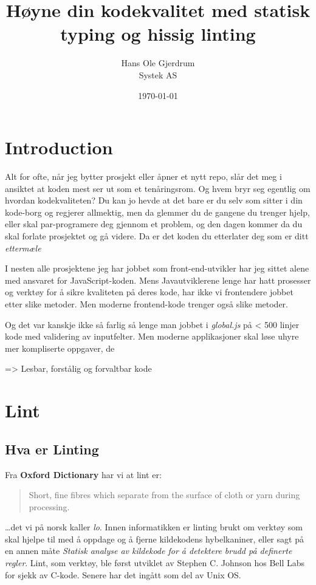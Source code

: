 \documentclass[12pt,norsk,a4enc per]{article}
\title{Høyne din  kodekvalitet med statisk typing og hissig linting }
\author{Hans Ole Gjerdrum \\Systek AS}
\date{\today}
\begin{document}
\maketitle


\section{Introduction}
Alt for ofte, når jeg bytter prosjekt eller åpner et nytt repo, slår det meg i
ansiktet at koden mest ser ut som et tenåringsrom. Og hvem bryr seg egentlig om
hvordan kodekvaliteten? Du kan jo hevde at det bare er du selv som sitter i din
kode-borg og regjerer allmektig, men da glemmer du de gangene du trenger hjelp,
eller skal par-programere deg gjennom et problem, og den dagen kommer da du skal
forlate prosjektet og gå videre. Da er det koden du etterlater deg som er ditt
\textit{ettermæle}


I nesten alle prosjektene jeg har jobbet som front-end-utvikler har jeg sittet
alene med ansvaret for JavaScript-koden. Mens Javautviklerene lenge har hatt
prosesser og verktøy for å sikre kvaliteten på deres kode, har ikke vi
frontendere jobbet etter slike metoder. Men moderne frontend-kode trenger også
slike metoder.


Og det var kanskje ikke så farlig så
lenge man jobbet i \textit{global.js} på < 500 linjer kode med validering av
inputfelter. Men moderne applikasjoner skal løse uhyre  mer kompliserte oppgaver, de



=> Lesbar, forstålig og forvaltbar kode

\section{Lint}

\subsection{Hva er Linting}
Fra \textbf{Oxford Dictionary} har vi at lint er:
\begin{quote}
Short, fine fibres which separate from the surface of cloth or yarn during
processing.
\end{quote}

\ldots det vi på norsk kaller \textit{lo}. Innen informatikken er linting brukt
om verktøy som skal hjelpe til med å oppdage og å fjerne kildekodens
hybelkaniner, eller sagt på en annen måte \textit{Statisk analyse av kildekode
  for å detektere brudd på definerte regler}. Lint, som verktøy, ble først
utviklet av Stephen C. Johnson hos Bell Labs for sjekk av C-kode. Senere har det
ingått som del av Unix OS.
\end{document}
